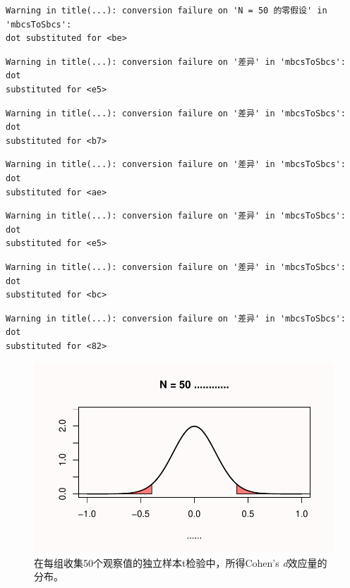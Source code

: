 \documentclass[
  letterpaper,
  DIV=11,
  numbers=noendperiod]{scrreprt}
\begin{document}
\begin{verbatim}
Warning in title(...): conversion failure on 'N = 50 的零假设' in 'mbcsToSbcs':
dot substituted for <be>
\end{verbatim}

\begin{verbatim}
Warning in title(...): conversion failure on '差异' in 'mbcsToSbcs': dot
substituted for <e5>
\end{verbatim}

\begin{verbatim}
Warning in title(...): conversion failure on '差异' in 'mbcsToSbcs': dot
substituted for <b7>
\end{verbatim}

\begin{verbatim}
Warning in title(...): conversion failure on '差异' in 'mbcsToSbcs': dot
substituted for <ae>
\end{verbatim}

\begin{verbatim}
Warning in title(...): conversion failure on '差异' in 'mbcsToSbcs': dot
substituted for <e5>
\end{verbatim}

\begin{verbatim}
Warning in title(...): conversion failure on '差异' in 'mbcsToSbcs': dot
substituted for <bc>
\end{verbatim}

\begin{verbatim}
Warning in title(...): conversion failure on '差异' in 'mbcsToSbcs': dot
substituted for <82>
\end{verbatim}

\begin{figure}

{\centering \includegraphics[width=1\textwidth,height=\textheight]{01-pvalue_files/figure-pdf/fig-fig131-1.pdf}

}

\caption{\label{fig-fig131}在每组收集50个观察值的独立样本t检验中，所得Cohen's
\emph{d}效应量的分布。}

\end{figure}
\end{document}
